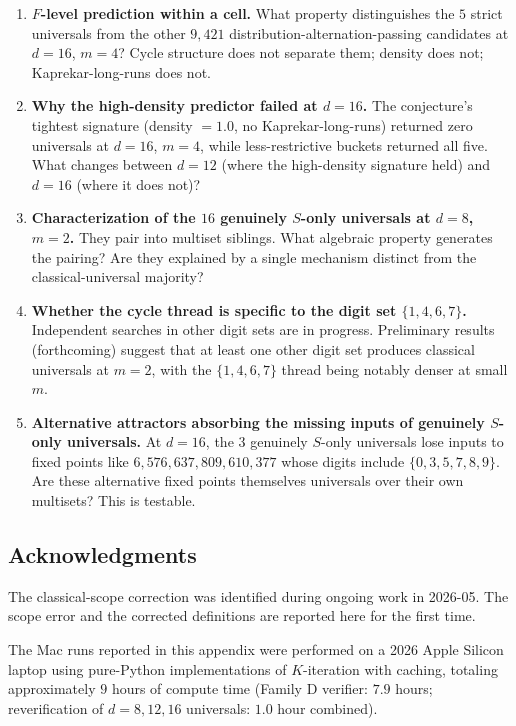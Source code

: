 \documentclass[11pt,letterpaper]{article}
\theoremstyle{paperstyle}
\theoremstyle{paperstyledef}
\theoremstyle{paperstylerem}
\begin{document}
\begin{enumerate}
\def\labelenumi{\arabic{enumi}.}
\item
  \textbf{\(F\)-level prediction within a cell.} What property
  distinguishes the \(5\) strict universals from the other \(9{,}421\)
  distribution-alternation-passing candidates at \(d = 16\), \(m = 4\)?
  Cycle structure does not separate them; density does not;
  Kaprekar-long-runs does not.
\item
  \textbf{Why the high-density predictor failed at \(d = 16\).} The
  conjecture's tightest signature (density \(= 1.0\), no
  Kaprekar-long-runs) returned zero universals at \(d = 16\), \(m = 4\),
  while less-restrictive buckets returned all five. What changes between
  \(d = 12\) (where the high-density signature held) and \(d = 16\)
  (where it does not)?
\item
  \textbf{Characterization of the \(16\) genuinely \(S\)-only universals
  at \(d = 8\), \(m = 2\).} They pair into multiset siblings. What
  algebraic property generates the pairing? Are they explained by a
  single mechanism distinct from the classical-universal majority?
\item
  \textbf{Whether the cycle thread is specific to the digit set
  \(\{1, 4, 6, 7\}\).} Independent searches in other digit sets are in
  progress. Preliminary results (forthcoming) suggest that at least one
  other digit set produces classical universals at \(m = 2\), with the
  \(\{1, 4, 6, 7\}\) thread being notably denser at small \(m\).
\item
  \textbf{Alternative attractors absorbing the missing inputs of
  genuinely \(S\)-only universals.} At \(d = 16\), the \(3\) genuinely
  \(S\)-only universals lose inputs to fixed points like
  \(6{,}576{,}637{,}809{,}610{,}377\) whose digits include
  \(\{0, 3, 5, 7, 8, 9\}\). Are these alternative fixed points
  themselves universals over their own multisets? This is testable.
\end{enumerate}

\hypertarget{g.9-acknowledgments}{%
\subsection{Acknowledgments}\label{g.9-acknowledgments}}

The classical-scope correction was identified during ongoing work in
2026-05. The scope error and the corrected definitions are reported here
for the first time.

The Mac runs reported in this appendix were performed on a 2026 Apple
Silicon laptop using pure-Python implementations of \(K\)-iteration with
caching, totaling approximately \(9\) hours of compute time (Family D
verifier: \(7.9\) hours; reverification of \(d = 8, 12, 16\) universals:
\(1.0\) hour combined).
\end{document}
